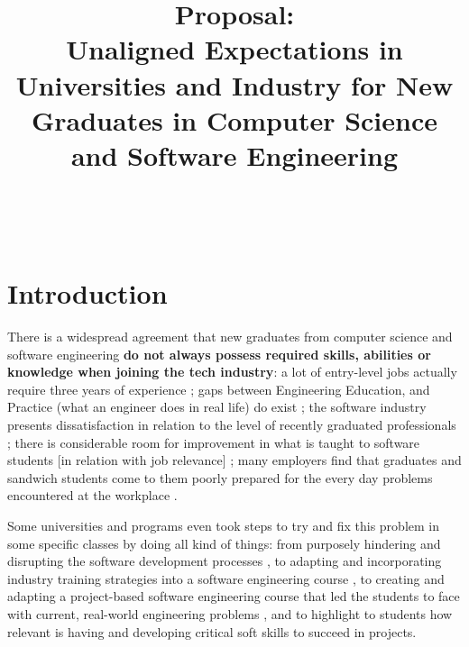 \documentclass{sigchi}
\begin{document}
\title{Proposal:\\ Unaligned Expectations in Universities and Industry for New Graduates in Computer Science and Software Engineering}

\author{%
  \\
  \\
}

\maketitle

\section{Introduction}
There is a widespread agreement that new graduates from computer science and software engineering \textbf{do not always possess required skills, abilities or knowledge when joining the tech industry}: a lot of entry-level jobs actually require three years of experience \cite{Chakrabarti2018}; gaps between Engineering Education, and Practice (what an engineer does in real life) do exist \cite{Sivanesan2017}; the software industry presents dissatisfaction in relation to the level of recently graduated professionals \cite{Portela2017}; there is considerable room for improvement in what is taught to software students [in relation with job relevance] \cite{Lethbridgea}; many employers find that graduates and sandwich students come to them poorly prepared for the every day problems encountered at the workplace \cite{Dawson2000}.

Some universities and programs even took steps to try and fix this problem in some specific classes by doing all kind of things: from purposely hindering and disrupting the software development processes \cite{Dawson2000}, to adapting and incorporating industry training strategies into a software engineering course \cite{Portela2017}, to creating and adapting a project-based software engineering course that led the students to face with current, real-world engineering problems \cite{Delgado2017}, and to highlight to students how relevant is having and developing critical soft skills to succeed in projects\cite{Bastarrica2017}.
\end{document}
